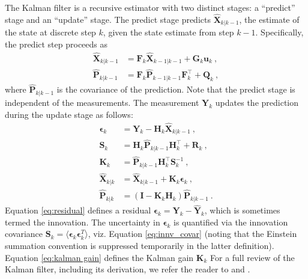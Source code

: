 \documentclass[fleqn,usenatbib,useAMS]{mnras}
\begin{document}
The Kalman filter is a recursive estimator with two distinct stages: a ``predict'' stage and an ``update'' stage. The predict stage predicts $\hat{\boldsymbol{X}}_{k|k-1}$, the estimate of the state at discrete step $k$, given the state estimate from step $k-1$. Specifically, the predict step proceeds as
\begin{align}
	\hat{\boldsymbol{X}}_{k|k-1} &=  \boldsymbol{F}_k \hat{\boldsymbol{X}}_{k-1|k-1} + \boldsymbol{G}_k \boldsymbol{u}_k \ , \\
	\hat{\boldsymbol{P}}_{k|k-1} &=  \boldsymbol{F}_k \hat{\boldsymbol{P}}_{k-1|k-1} \boldsymbol{F}_k^\intercal + \boldsymbol{Q}_k  \ ,
\end{align}
where $\hat{\boldsymbol{P}}_{k|k-1}$ is the covariance of the prediction. Note that the predict stage is independent of the measurements. The measurement $\boldsymbol{Y}_k$ updates the prediction during the update stage as follows:
\begin{align}
	\boldsymbol{\epsilon}_{k} &= \boldsymbol{Y}_k - \boldsymbol{H}_k \hat{\boldsymbol{X}}_{k|k-1} \ , \label{eq:residual} \\
	\boldsymbol{S}_k &= \boldsymbol{H}_k \hat{\boldsymbol{P}}_{k|k-1} \boldsymbol{H}_k^\intercal + \boldsymbol{R}_k \ , \label{eq:innv_covar}\\
	\boldsymbol{K}_k &= \hat{\boldsymbol{P}}_{k|k-1} \boldsymbol{H}_k^\intercal \boldsymbol{S}_k^{-1} \ ,\label{eq:kalman gain} \\
	\hat{\boldsymbol{X}}_{k|k} &=\hat{\boldsymbol{X}}_{k|k-1} +\boldsymbol{K}_k  \boldsymbol{\epsilon}_{k}  \ , \label{eq:kalmangainupdate} \\
	\hat{\boldsymbol{P}}_{k|k} &= \left( \boldsymbol{I} - \boldsymbol{K}_k \boldsymbol{H}_k \right) 	\hat{\boldsymbol{P}}_{k|k-1} \ .
\end{align}
Equation \eqref{eq:residual} defines a residual $\boldsymbol{\epsilon}_k = \boldsymbol{Y}_k  - \hat{\boldsymbol{Y}}_k$, which is sometimes termed the innovation. The uncertainty in $\boldsymbol{\epsilon}_k$ is quantified via the innovation covariance $\boldsymbol{S}_k = \langle \boldsymbol{\epsilon}_k \boldsymbol{\epsilon}_k^{T} \rangle$, viz. Equation \eqref{eq:innv_covar} (noting that the Einstein summation convention is suppressed temporarily in the latter definition). Equation \eqref{eq:kalman gain} defines the Kalman gain $\boldsymbol{K}_k$ For a full review of the Kalman filter, including its derivation, we refer the reader to \cite{Gelb:1974} and \cite{zarchan2000fundamentals}. \newline 
\end{document}
